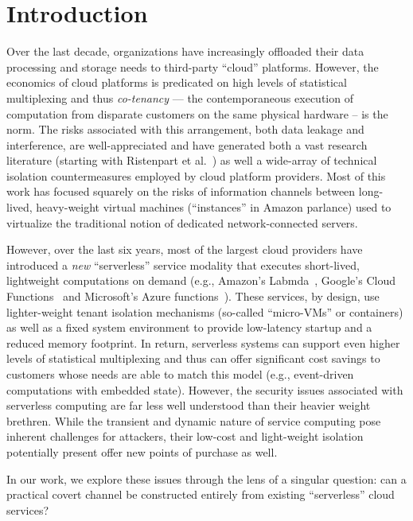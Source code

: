 \section{Introduction}
\label{sec:intro}

Over the last decade, organizations have increasingly offloaded their
data processing and storage needs to third-party ``cloud'' platforms.
However, the economics of cloud platforms is predicated on high levels
of statistical multiplexing and thus \emph{co-tenancy} --- the
contemporaneous execution of computation from disparate customers on
the same physical hardware -- is the norm.  The risks associated with
this arrangement, both data leakage and interference, are
well-appreciated and have generated both a vast research literature
(starting with Ristenpart et al.~\cite{ristenpartccs2009}) as well a
wide-array of technical isolation countermeasures employed by cloud
platform providers. Most of this work has focused squarely on the risks
of information channels between long-lived, heavy-weight virtual
machines (``instances'' in Amazon parlance) used to virtualize the
traditional notion of dedicated network-connected servers.

However, over the last six years, most of the largest cloud providers have
introduced a \emph{new} ``serverless'' service modality that executes
short-lived, lightweight computations on demand (e.g., Amazon's
Labmda~\cite{awslambda}, Google's Cloud Functions~\cite{gcpfunctions} and
Microsoft's Azure functions~\cite{azurefunctions}).  These services, by design,
use lighter-weight tenant isolation mechanisms (so-called ``micro-VMs'' or
containers) as well as a fixed system environment to provide low-latency startup
and a reduced memory footprint.  In return, serverless systems can support even
higher levels of statistical multiplexing and thus can offer significant cost
savings to customers whose needs are able to match this model (e.g.,
event-driven computations with embedded state).  However, the security issues
associated with serverless computing are far less well understood than their
heavier weight brethren.  While the transient and dynamic nature of service
computing pose inherent challenges for attackers, their low-cost and
light-weight isolation potentially present offer new points of purchase as well.

In our work, we explore these issues through the lens of a singular question:
can a practical covert channel be constructed entirely from existing
``serverless'' cloud services?

